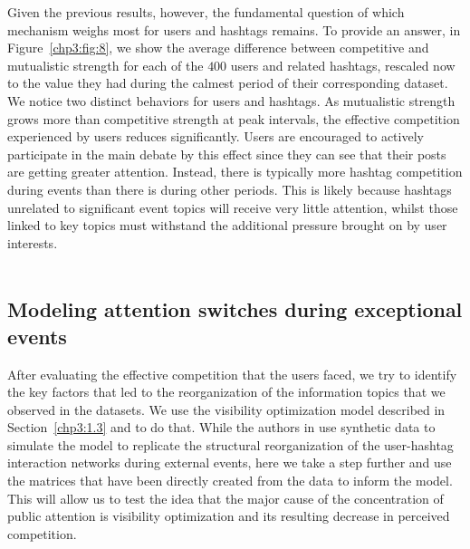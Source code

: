 Given the previous results, however, the fundamental question of which mechanism weighs most for users and hashtags remains. To provide an answer, in Figure~\ref{chp3:fig:8}, we show the average difference between competitive and mutualistic strength for each of the $400$ users and related hashtags, rescaled now to the value they had during the calmest period of their corresponding dataset. We notice two distinct behaviors for users and hashtags. As mutualistic strength grows more than competitive strength at peak intervals, the effective competition experienced by users reduces significantly.  Users are encouraged to actively participate in the main debate by this effect since they can see that their posts are getting greater attention. 
Instead, there is typically more hashtag competition during events than there is during other periods. This is likely because hashtags unrelated to significant event topics will receive very little attention, whilst those linked to key topics must withstand the additional pressure brought on by user interests. \\ \\

\subsection{Modeling attention switches during exceptional events}
\label{chp3:2.4}

After evaluating the effective competition that the users faced, we try to identify the key factors that led to the reorganization of the information topics that we observed in the datasets. We use the visibility optimization model described in Section~\ref{chp3:1.3} and \cite{palazzi2021ecological} to do that. While the authors in \cite{palazzi2021ecological} use synthetic data to simulate the model to replicate the structural reorganization of the user-hashtag interaction networks during external events, here we take a step further and use the matrices that have been directly created from the data to inform the model. This will allow us to test the idea that the major cause of the concentration of public attention is visibility optimization and its resulting decrease in perceived competition. \\

